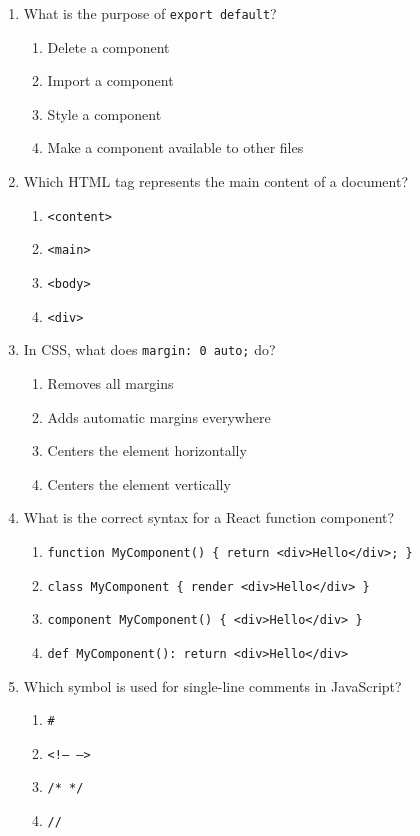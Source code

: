 \documentclass[12pt,a4paper]{article}
\begin{document}
\begin{enumerate}
\item What is the purpose of \texttt{export default}?
\begin{enumerate}[label=\Alph*)]
    \item Delete a component
    \item Import a component
    \item Style a component
    \item Make a component available to other files
\end{enumerate}

\item Which HTML tag represents the main content of a document?
\begin{enumerate}[label=\Alph*)]
    \item \texttt{<content>}
    \item \texttt{<main>}
    \item \texttt{<body>}
    \item \texttt{<div>}
\end{enumerate}

\item In CSS, what does \texttt{margin: 0 auto;} do?
\begin{enumerate}[label=\Alph*)]
    \item Removes all margins
    \item Adds automatic margins everywhere
    \item Centers the element horizontally
    \item Centers the element vertically
\end{enumerate}

\item What is the correct syntax for a React function component?
\begin{enumerate}[label=\Alph*)]
    \item \texttt{function MyComponent() \{ return <div>Hello</div>; \}}
    \item \texttt{class MyComponent \{ render <div>Hello</div> \}}
    \item \texttt{component MyComponent() \{ <div>Hello</div> \}}
    \item \texttt{def MyComponent(): return <div>Hello</div>}
\end{enumerate}

\item Which symbol is used for single-line comments in JavaScript?
\begin{enumerate}[label=\Alph*)]
    \item \texttt{\#}
    \item \texttt{<!-- -->}
    \item \texttt{/* */}
    \item \texttt{//}
\end{enumerate}


\end{enumerate}
\end{document}
